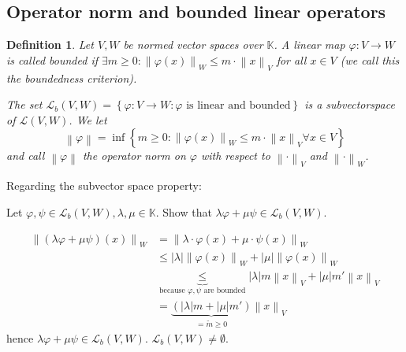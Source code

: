 \documentclass{article}
\newtheorem{definition}{Definition}  \numberwithin{definition}{section}
\newcommand{\set}[1]{\left\{#1\right\}}
\newcommand{\norm}[1]{\left\|#1\right\|}
\newcommand{\card}[1]{\left|#1\right|}
\begin{document}
\subsection{Operator norm and bounded linear operators}

\begin{definition} %
  \label{opdef}
  Let $V, W$ be normed vector spaces over $\mathbb K$. A linear map $\varphi: V \to W$ is called \emph{bounded} if $\exists m \geq 0: \norm{\varphi(x)}_W \leq m \cdot \norm{x}_V$ for all $x \in V$ (we call this the \emph{boundedness criterion}).

  The set $\mathcal L_b(V, W) = \set{\varphi: V \to W: \varphi \text{ is linear and bounded}}$ is a subvectorspace of $\mathcal L(V, W)$. We let
  \[ \norm{\varphi} = \inf\set{m \geq 0: \norm{\varphi(x)}_W \leq m \cdot \norm{x}_V \forall x \in V} \]
  and call $\norm{\varphi}$ the \emph{operator norm} on $\varphi$ with respect to $\norm{\cdot}_V$ and $\norm{\cdot}_W$.
\end{definition}

Regarding the subvector space property:

Let $\varphi, \psi \in \mathcal L_b(V, W), \lambda, \mu \in \mathbb K$.
Show that $\lambda \varphi + \mu \psi \in \mathcal L_b(V, W)$.

\begin{align*}
  \norm{(\lambda \varphi + \mu \psi)(x)}_W
    &= \norm{\lambda \cdot \varphi(x) + \mu \cdot \psi(x)}_W \\
    &\leq \card{\lambda} \norm{\varphi(x)}_W + \card{\mu} \norm{\varphi(x)}_W \\
    &\underbrace{\leq}_{\text{because } \varphi, \psi \text{ are bounded}} \card{\lambda} m \norm{x}_V + \card{\mu} m' \norm{x}_V \\
    &= \underbrace{\left(\card{\lambda} m + \card{\mu} m'\right)}_{= \tilde m \geq 0} \norm{x}_V
\end{align*}
hence $\lambda \varphi + \mu \psi \in \mathcal L_b(V, W)$.
$\mathcal L_b(V, W) \neq \emptyset$.
\end{document}
